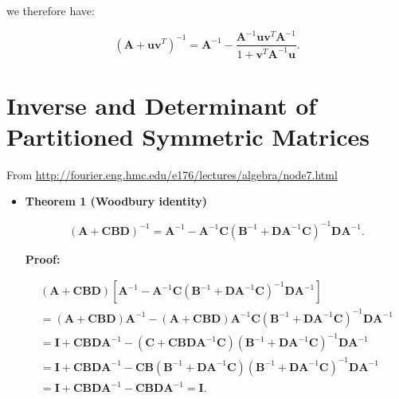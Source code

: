 \documentclass[10pt,b5paper,titlepage]{book}
\begin{document}
we therefore have:

\begin{equation}
    (\mathbf{A} + \mathbf{u}\mathbf{v}^{T})^{-1}
    = \mathbf{A}^{-1}
    - \frac{\mathbf{A}^{-1}\mathbf{u}\mathbf{v}^{T}\mathbf{A}^{-1}}
    {1 + \mathbf{v}^{T}\mathbf{A}^{-1}\mathbf{u}}
.\end{equation}



\chapter{Inverse and Determinant of Partitioned Symmetric Matrices}
From \url{http://fourier.eng.hmc.edu/e176/lectures/algebra/node7.html}

\begin{itemize}
    \item \textbf{Theorem 1 (Woodbury identity)}

        \begin{equation}
            (\mathbf{A} + \mathbf{C} \mathbf{B} \mathbf{D})^{-1} =
            \mathbf{A}^{-1} - \mathbf{A}^{-1} \mathbf{C} (\mathbf{B}^{-1} + \mathbf{D} \mathbf{A}^{-1} \mathbf{C})^{-1} \mathbf{D} \mathbf{A}^{-1}
        .\end{equation}

        \textbf{Proof:}

        \begin{equation}
            \begin{array}{l}
                (\mathbf{A} + \mathbf{C} \mathbf{B} \mathbf{D}) [\mathbf{A}^{-1} - \mathbf{A}^{-1} \mathbf{C} (\mathbf{B}^{-1} + \mathbf{D} \mathbf{A}^{-1} \mathbf{C})^{-1} \mathbf{D} \mathbf{A}^{-1}]\\
                = (\mathbf{A} + \mathbf{C} \mathbf{B} \mathbf{D}) \mathbf{A}^{-1} - (\mathbf{A} + \mathbf{C} \mathbf{B} \mathbf{D}) \mathbf{A}^{-1} \mathbf{C} ( \mathbf{B}^{-1} + \mathbf{D} \mathbf{A}^{-1} \mathbf{C})^{-1} \mathbf{D} \mathbf{A}^{-1}\\
                = \mathbf{I} + \mathbf{C} \mathbf{B} \mathbf{D} \mathbf{A}^{-1} - (\mathbf{C} + \mathbf{C} \mathbf{B} \mathbf{D} \mathbf{A}^{-1} \mathbf{C}) (\mathbf{B}^{-1} + \mathbf{D} \mathbf{A}^{-1} \mathbf{C})^{-1} \mathbf{D} \mathbf{A}^{-1}\\
                = \mathbf{I} + \mathbf{C} \mathbf{B} \mathbf{D} \mathbf{A}^{-1} - \mathbf{C} \mathbf{B} (\mathbf{B}^{-1} + \mathbf{D} \mathbf{A}^{-1} \mathbf{C}) (\mathbf{B}^{-1} + \mathbf{D} \mathbf{A}^{-1} \mathbf{C})^{-1} \mathbf{D} \mathbf{A}^{-1}\\
                = \mathbf{I} + \mathbf{C} \mathbf{B} \mathbf{D} \mathbf{A}^{-1} - \mathbf{C} \mathbf{B} \mathbf{D} \mathbf{A}^{-1} = \mathbf{I}.
            \end{array}
        \end{equation}


\end{itemize}
\end{document}
